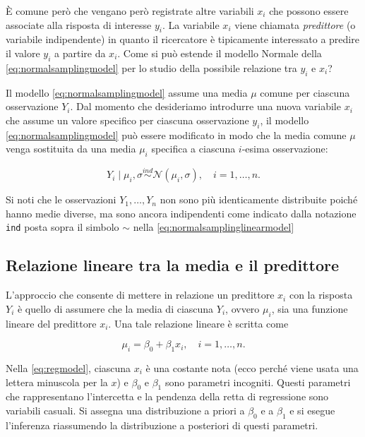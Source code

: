 \documentclass[
  10pt,
  italian,
  a4paper,
  extrafontsizes,onecolumn,openright
  ]{memoir}
\begin{document}
È comune però che vengano però registrate altre variabili \(x_i\) che possono essere associate alla risposta di interesse \(y_i\). La variabile \(x_i\) viene chiamata \emph{predittore} (o variabile indipendente) in quanto il ricercatore è tipicamente interessato a predire il valore \(y_i\) a partire da \(x_i\). Come si può estende il modello Normale della \eqref{eq:normalsamplingmodel} per lo studio della possibile relazione tra \(y_i\) e \(x_i\)?

Il modello \eqref{eq:normalsamplingmodel} assume una media \(\mu\) comune per ciascuna osservazione \(Y_i\). Dal momento che desideriamo introdurre una nuova variabile \(x_i\) che assume un valore specifico per ciascuna osservazione \(y_i\), il modello \eqref{eq:normalsamplingmodel} può essere modificato in modo che la media comune \(\mu\) venga sostituita da una media \(\mu_i\) specifica a ciascuna \(i\)-esima osservazione:

\begin{equation}
Y_i \mid \mu_i, \sigma \stackrel{ind}{\sim} \mathcal{N}(\mu_i, \sigma), \quad i = 1, \dots, n.
\label{eq:normalsamplinglinearmodel}
\end{equation}

Si noti che le osservazioni \(Y_1, \dots, Y_n\) non sono più identicamente distribuite poiché hanno medie diverse, ma sono ancora indipendenti come indicato dalla notazione \texttt{ind} posta sopra il simbolo \(\sim\) nella \eqref{eq:normalsamplinglinearmodel}

\hypertarget{relazione-lineare-tra-la-media-e-il-predittore}{%
\subsection{Relazione lineare tra la media e il predittore}\label{relazione-lineare-tra-la-media-e-il-predittore}}

L'approccio che consente di mettere in relazione un predittore \(x_i\) con la risposta \(Y_i\) è quello di assumere che la media di ciascuna \(Y_i\), ovvero \(\mu_i\), sia una funzione lineare del predittore \(x_i\). Una tale relazione lineare è scritta come

\begin{equation}
\mu_i = \beta_0 + \beta_ 1 x_i, \quad i = 1, \dots, n.
\label{eq:regmodel}
\end{equation}

Nella \eqref{eq:regmodel}, ciascuna \(x_i\) è una costante nota (ecco perché viene usata una lettera minuscola per la \(x\)) e \(\beta_0\) e \(\beta_ 1\) sono parametri incogniti. Questi parametri che rappresentano l'intercetta e la pendenza della retta di regressione sono variabili casuali. Si assegna una distribuzione a priori a \(\beta_0\) e a \(\beta_ 1\) e si esegue l'inferenza riassumendo la distribuzione a posteriori di questi parametri.
\end{document}
